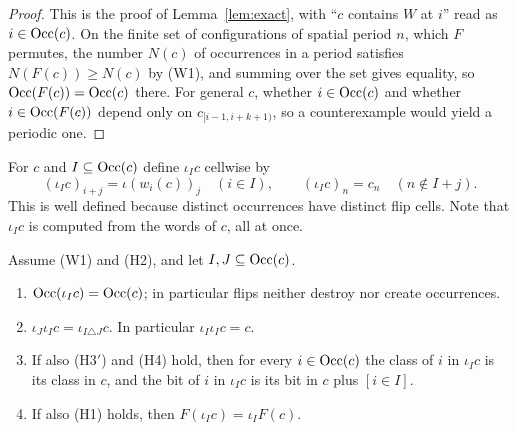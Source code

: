 \begin{proof}
This is the proof of Lemma~\ref{lem:exact}, with ``$c$ contains $W$ at $i$'' read as $i\in\operatorname{Occ}(c)$. On the finite set of configurations of spatial period $n$, which $F$ permutes, the number $N(c)$ of occurrences in a period satisfies $N(F(c))\ge N(c)$ by (W1), and summing over the set gives equality, so $\operatorname{Occ}(F(c))=\operatorname{Occ}(c)$ there. For general $c$, whether $i\in\operatorname{Occ}(c)$ and whether $i\in\operatorname{Occ}(F(c))$ depend only on $c_{[i-1,i+k+1)}$, so a counterexample would yield a periodic one.
\end{proof}

For $c$ and $I\subseteq\operatorname{Occ}(c)$ define $\iota_Ic$ cellwise by
\[
(\iota_Ic)_{i+j}=\iota(w_i(c))_j\quad(i\in I),\qquad (\iota_Ic)_n=c_n\quad(n\notin I+j).
\]
This is well defined because distinct occurrences have distinct flip cells. Note that $\iota_Ic$ is computed from the words of $c$, all at once.

\begin{lemma}\label{hw:flips}
Assume \textup{(W1)} and \textup{(H2)}, and let $I,J\subseteq\operatorname{Occ}(c)$.
\begin{enumerate}
\item[(a)] $\operatorname{Occ}(\iota_Ic)=\operatorname{Occ}(c)$; in particular flips neither destroy nor create occurrences.
\item[(b)] $\iota_J\iota_Ic=\iota_{I\triangle J}c$. In particular $\iota_I\iota_Ic=c$.
\item[(c)] If also \textup{(H3$'$)} and \textup{(H4)} hold, then for every $i\in\operatorname{Occ}(c)$ the class of $i$ in $\iota_Ic$ is its class in $c$, and the bit of $i$ in $\iota_Ic$ is its bit in $c$ plus $[i\in I]$.
\item[(d)] If also \textup{(H1)} holds, then $F(\iota_Ic)=\iota_IF(c)$.
\end{enumerate}
\end{lemma}

